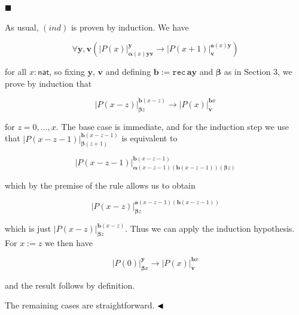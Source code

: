  
 
\par\noindent  $\blacksquare$ 
 
As usual, $(ind)$ is proven by induction. We have\par
  
\par  \quad  \[\forall\bm{y},\bm{v}\left(|{P(x)}|^{\bm{y}}_{\bm{\alpha}(x)\bm{y}\bm{v}}\to|{P(x+1)}|^{\bm{a}(x)\bm{y}}_{\bm{v}}\right)\]\quad  \quad  
  
for all $x:\mathsf{nat}$, so fixing $\bm{y}$, $\bm{v}$ and defining $\bm{b}:=\mathtt{rec}\,\bm{a}\bm{y}$ and $\bm{\beta}$ as in Section 3, we prove by induction that\par
  
\par  \quad  \[|{P(x-z)}|^{\bm{b}(x-z)}_{\bm{\beta}z}\to|{P(x)}|^{\bm{b}x}_{\bm{v}}\]\quad  \quad  
  
for $z=0,\ldots,x$. The base case is immediate, and for the induction step we use that $|{P(x-z-1)}|^{\bm{b}(x-z-1)}_{\bm{\beta}(z+1)}$ is equivalent to\par
  
\par  \quad  \[|{P(x-z-1)}|^{\bm{b}(x-z-1)}_{\bm{\alpha}(x-z-1)(\bm{b}(x-z-1))(\bm{\beta}z)}\]\quad  \quad  
  
which by the premise of the rule allows us to obtain\par
  
\par  \quad  \[|{P(x-z)}|^{\bm{a}(x-z-1)(\bm{b}(x-z-1))}_{\bm{\beta}z}\]\quad  \quad  
  
which is just $|{P(x-z)}|^{\bm{b}(x-z)}_{\bm{\beta}z}$. Thus we can apply the induction hypothesis. For $x:=z$ we then have\par
  
\par  \quad  \[|{P(0)}|^{\bm{y}}_{\bm{\beta}x}\to|{P(x)}|^{\bm{b}x}_{\bm{v}}\]\quad  \quad  
  
and the result follows by definition.\par
 
 
  
The remaining cases are straightforward. $\hfill\blacktriangleleft$\par
 
 
 
